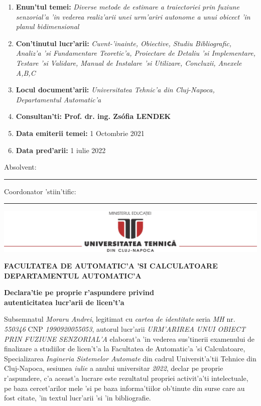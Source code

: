 \documentclass[12pt,a4paper,twoside]{report}
\newcommand{\department}{FACULTATEA DE AUTOMATIC'A 'SI CALCULATOARE\\
DEPARTAMENTUL AUTOMATIC'A}
\newcommand{\uline}[1]{\rule[0pt]{#1}{0.4pt}}
\newcommand{\utcnlogo}{\includegraphics[width=15cm]{img/utcn.jpg}}
\begin{document}
\vspace{1cm}

\begin{enumerate}
 \item {\bf Enun'tul temei:} {\it Diverse metode de estimare a traiectoriei prin fuziune senzorial'a 'in vederea realiz'arii unei urm'ariri autonome a unui obicect 'in planul bidimensional}
\item {\bf Con'tinutul lucr'arii:} {\it Cuv\ia nt-'inainte, Obiective, Studiu Bibliografic, Analiz'a 'si Fundamentare Teoretic'a, Proiectare de Detaliu 'si Implementare, Testare 'si Validare, Manual de Instalare 'si Utilizare, Concluzii, Anexele A,B,C}
\item {\bf Locul document'arii:} {\it Universitatea Tehnic'a din Cluj-Napoca, Departamentul Automatic'a}
\item {\bf Consultan'ti: Prof. dr. ing. Zsófia LENDEK}
\item {\bf Data emiterii temei:} 1 Octombrie 2021
\item {\bf Data pred'arii:} 1 iulie 2022 
 \end{enumerate}
\vspace{1.2cm}

\hspace{5cm} Absolvent: \uline{3cm}

\vspace{0.5cm}
\hspace{5cm} Coordonator 'stiin'tific: \uline{3cm}

\thispagestyle{empty}

\newpage

\begin{center}
\utcnlogo

{\bf \department}
\end{center}

\vspace{0.5cm}

\begin{center}
{\bf
Declara'tie pe proprie r'aspundere privind\\ 
autenticitatea lucr'arii de licen't'a}
\end{center}
\vspace{1cm}



Subsemnatul \textit{Moraru Andrei}, 
legitimat cu \textit{cartea de identitate} seria \textit{MH} nr. \textit{550346}
CNP \textit{1990920055053}, autorul lucr'arii \textit{URM'ARIREA UNUI OBIECT PRIN FUZIUNE SENZORIAL'A}
elaborat'a 'in vederea sus'tinerii examenului de finalizare a studiilor de licen't'a la Facultatea de Automatic'a 'si Calculatoare, Specializarea \textit{Ingineria Sistemelor Automate} din cadrul Universit'a'tii Tehnice din Cluj-Napoca, sesiunea \textit{iulie} a anului universitar \textit{2022}, declar pe proprie r'aspundere, c'a aceast'a lucrare este rezultatul propriei activit'a'ti intelectuale, pe baza cercet'arilor mele 'si pe baza informa'tiilor ob'tinute din surse care au fost citate, 'in textul lucr'arii 'si 'in bibliografie.
\end{document}

